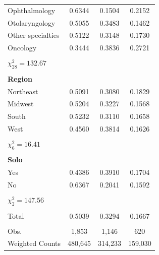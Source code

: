 \documentclass[12pt]{report}
\begin{document}
{\begin{center}
\begin{longtable}{lccc}
Ophthalmology                          & 0.6344   & 0.1504     & 0.2152     \\
Otolaryngology                         & 0.5055   & 0.3483     & 0.1462     \\
Other specialties                      & 0.5122   & 0.3148     & 0.1730     \\
Oncology                               & 0.3444   & 0.3836     & 0.2721     \\
                                       &          &            &            \\
$\chi^2_{28} = 132.67$                 &          &            &            \\
                                       &          &            &            \\
\textbf{Region}                        &          &            &            \\
Northeast                              & 0.5091   & 0.3080     & 0.1829     \\
Midwest                                & 0.5204   & 0.3227     & 0.1568     \\
South                                  & 0.5232   & 0.3110     & 0.1658     \\
West                                   & 0.4560   & 0.3814     & 0.1626     \\
                                       &          &            &            \\
$\chi^2_6 = 16.41$                     &          &            &            \\
                                       &          &            &            \\
\textbf{Solo}                          &          &            &            \\
Yes                                    & 0.4386   & 0.3910     & 0.1704     \\
No                                     & 0.6367   & 0.2041     & 0.1592     \\
                                       &          &            &            \\
$\chi^2_2 = 147.56$                    &          &            &            \\
                                       &          &            &            \\
Total                                  & 0.5039   & 0.3294     & 0.1667     \\
                                       &          &            &            \\
Obs.                                   & 1,853    & 1,146      & 620        \\
Weighted Counts                        & 480,645  & 314,233    & 159,030    \\ 
\end{longtable}
\end{center}}
\end{document}
